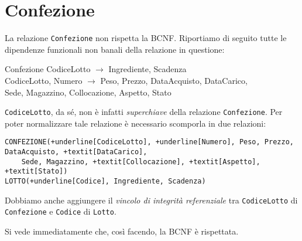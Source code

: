 \section{Confezione}\label{sec:confezione}
La relazione {\tt Confezione} non rispetta la BCNF. Riportiamo di seguito tutte
le dipendenze funzionali non banali della relazione in questione:
\begin{funcdep}{Confezione}
    CodiceLotto $\to$ Ingrediente, Scadenza\\
    CodiceLotto, Numero $\to$ Peso, Prezzo, DataAcquisto, DataCarico,\\
        \indent\indent\indent\indent\indent  Sede, Magazzino, Collocazione, Aspetto, Stato
\end{funcdep}

\noindent\texttt{CodiceLotto}, da sé, non è infatti {\it superchiave} della relazione {\tt Confezione}.
Per poter normalizzare tale relazione è necessario scomporla in due relazioni:

\begin{Verbatim}[commandchars=+\[\]]
CONFEZIONE(+underline[CodiceLotto], +underline[Numero], Peso, Prezzo, DataAcquisto, +textit[DataCarico],
    Sede, Magazzino, +textit[Collocazione], +textit[Aspetto], +textit[Stato])
LOTTO(+underline[Codice], Ingrediente, Scadenza)
\end{Verbatim}
Dobbiamo anche aggiungere il {\it vincolo di integrità referenziale} tra {\tt CodiceLotto}
di {\tt Confezione} e {\tt Codice} di {\tt Lotto}.

\vspace{10pt}
\noindent Si vede immediatamente che, così facendo, la BCNF è rispettata.
